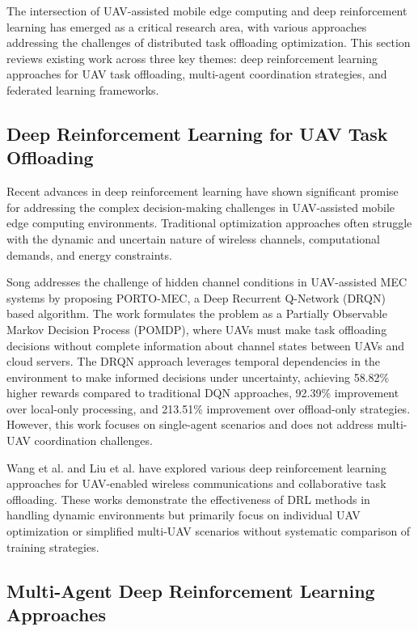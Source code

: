\documentclass[journal]{IEEEtran}
\begin{document}
The intersection of UAV-assisted mobile edge computing and deep reinforcement learning has emerged as a critical research area, with various approaches addressing the challenges of distributed task offloading optimization. This section reviews existing work across three key themes: deep reinforcement learning approaches for UAV task offloading, multi-agent coordination strategies, and federated learning frameworks.

\subsection{Deep Reinforcement Learning for UAV Task Offloading}

Recent advances in deep reinforcement learning have shown significant promise for addressing the complex decision-making challenges in UAV-assisted mobile edge computing environments. Traditional optimization approaches often struggle with the dynamic and uncertain nature of wireless channels, computational demands, and energy constraints.

Song \cite{song2024drqn} addresses the challenge of hidden channel conditions in UAV-assisted MEC systems by proposing PORTO-MEC, a Deep Recurrent Q-Network (DRQN) based algorithm. The work formulates the problem as a Partially Observable Markov Decision Process (POMDP), where UAVs must make task offloading decisions without complete information about channel states between UAVs and cloud servers. The DRQN approach leverages temporal dependencies in the environment to make informed decisions under uncertainty, achieving 58.82\% higher rewards compared to traditional DQN approaches, 92.39\% improvement over local-only processing, and 213.51\% improvement over offload-only strategies. However, this work focuses on single-agent scenarios and does not address multi-UAV coordination challenges.

Wang et al. \cite{wang2020deep} and Liu et al. \cite{liu2020multi} have explored various deep reinforcement learning approaches for UAV-enabled wireless communications and collaborative task offloading. These works demonstrate the effectiveness of DRL methods in handling dynamic environments but primarily focus on individual UAV optimization or simplified multi-UAV scenarios without systematic comparison of training strategies.

\subsection{Multi-Agent Deep Reinforcement Learning Approaches}
\end{document}
